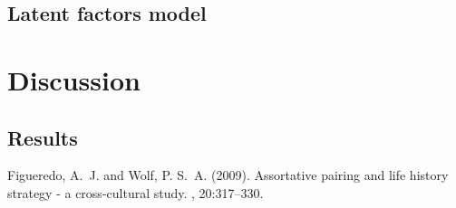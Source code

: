 \documentclass[twoside,twocolumn]{article}
\begin{document}
\subsection{Latent factors model}


\section{Discussion}

\subsection{Results}



\begin{thebibliography}{99} %

Figueredo, A.~J. and Wolf, P. S.~A. (2009).
\newblock Assortative pairing and life history strategy - a cross-cultural
  study.
, 20:317--330.
 
\end{thebibliography}

\end{document}
